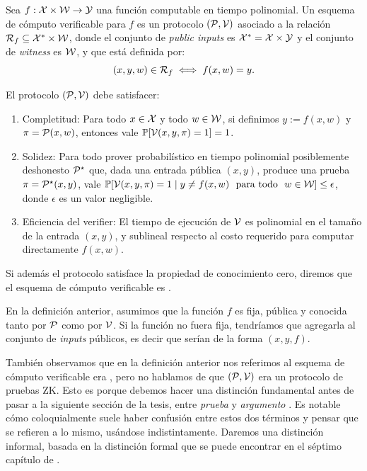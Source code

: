 \begin{definition}
\label{def:apendice-b-introduccion-esquema-de-computo-verificable-zk}
	Sea $f: \mathcal{X} \times \mathcal{W} \to \mathcal{Y}$ una función computable en tiempo polinomial. Un esquema de cómputo verificable para $f$ es un protocolo $(\mathcal{P}, \mathcal{V})$ asociado a la relación $\mathcal{R}_f \subseteq \mathcal{X}^* \times \mathcal{W}$, donde el conjunto de \textit{public inputs} es $\mathcal{X}^* = \mathcal{X} \times \mathcal{Y}$ y el conjunto de \textit{witness} es $\mathcal{W}$, y que está definida por:
	$$(x, y, w) \in \mathcal{R}_f \iff f(x,w) = y.$$
	
	El protocolo $(\mathcal{P}, \mathcal{V})$ debe satisfacer:
	\begin{enumerate}[noitemsep]
		\item Completitud: Para todo $x \in \mathcal{X}$ y todo $w \in \mathcal{W}$, si definimos $y := f(x,w)$ y $\pi = \mathcal{P}(x,w)$, entonces vale $\mathbb{P}[\mathcal{V}(x,y, \pi) = 1] = 1$.
		\item Solidez: Para todo prover probabilístico en tiempo polinomial posiblemente deshonesto $\mathcal{P}^\star$ que, dada una entrada pública $(x,y)$, produce una prueba $\pi = \mathcal{P}^\star(x,y)$, vale $\Prob[\Verifier(x, y, \pi) = 1 \mid y \neq f(x,w)\ \textnormal{ para todo }\ w \in \WitnessSpace] \leq \epsilon$, donde $\epsilon$ es un valor negligible.
		\item Eficiencia del verifier: El tiempo de ejecución de $\mathcal{V}$ es polinomial en el tamaño de la entrada $(x, y)$, y sublineal respecto al costo requerido para computar directamente $f(x,w)$.
	\end{enumerate}
	
	Si además el protocolo satisface la propiedad de conocimiento cero, diremos que el esquema de cómputo verificable es \ZK.
\end{definition}

En la definición anterior, asumimos que la función $f$ es fija, pública y conocida tanto por $\mathcal{P}$ como por $\mathcal{V}$. Si la función no fuera fija, tendríamos que agregarla al conjunto de \textit{inputs} públicos, es decir que serían de la forma $(x, y, f)$.

También observamos que en la definición anterior nos referimos al esquema de cómputo verificable era \ZK, pero no hablamos de que $(\mathcal{P}, \mathcal{V})$ era un protocolo de pruebas ZK. Esto es porque debemos hacer una distinción fundamental antes de pasar a la siguiente sección de la tesis, entre \textit{prueba \ZK} y \textit{argumento \ZK}. Es notable cómo coloquialmente suele haber confusión entre estos dos términos y pensar que se refieren a lo mismo, usándose indistintamente. Daremos una distinción informal, basada en la distinción formal que se puede encontrar en el séptimo capítulo de \cite{Goldreich2001}.

